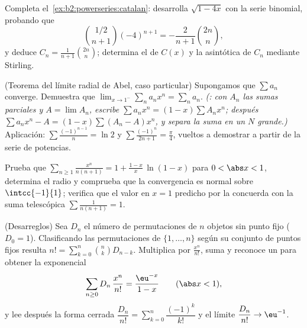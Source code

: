 \begin{exercise}[$\star\star\star$]\label{exo:b2:powerseries:8}
Completa el~\cref{ex:b2:powerseries:catalan}: desarrolla $\sqrt{1 -
4x}$ con la serie binomial, probando que
\[
\binom{1/2}{n+1}(-4)^{n+1} = -\frac{2}{n+1}\binom{2n}{n},
\]
y deduce $C_n = \frac{1}{n+1}\binom{2n}{n}$; determina el
 de $C(x)$ y la asintótica de $C_n$ mediante
Stirling.
\end{exercise}

\begin{exercise}[$\star\star\star$]\label{exo:b2:powerseries:9}
(Teorema del límite radial de Abel, caso particular) Supongamos que
$\sum a_n$ converge. Demuestra que $\lim_{x \to 1^-} \sum_{n} a_n
x^n = \sum_n a_n$. \emph{(: con $A_n$ las sumas
parciales y $A = \lim A_n$, escribe $\sum a_nx^n = (1 - x)\sum A_n
x^n$; después $\sum a_nx^n - A = (1-x)\sum (A_n - A)x^n$, y separa
la suma en un $N$ grande.)} Aplicación: $\sum \frac{(-1)^{n-1}}{n} =
\ln 2$ y $\sum \frac{(-1)^n}{2n+1} = \frac\pi4$, vueltos a demostrar
a partir de la serie de potencias.
\end{exercise}

\begin{exercise}[$\star$]\label{exo:b2:powerseries:10}
Prueba que $\displaystyle\sum_{n\geq1}\frac{x^n}{n(n+1)} = 1 +
\frac{1-x}{x}\,\ln(1-x)$ para $0 < \abs x < 1$, determina el radio y
comprueba que la convergencia es normal sobre $\intcc{-1}{1}$;
verifica que el valor en $x = 1$ predicho por la 
concuerda con la suma telescópica $\sum \frac{1}{n(n+1)} = 1$.
\end{exercise}

\begin{exercise}[$\star\star$]\label{exo:b2:powerseries:11}
(Desarreglos) Sea $D_n$ el número de permutaciones de $n$ objetos
sin punto fijo ($D_0 = 1$). Clasificando las permutaciones de $\{1,
\dots, n\}$ según su conjunto de puntos fijos resulta $n! =
\sum_{k=0}^{n}\binom nk D_{n-k}$. Multiplica por
$\frac{x^n}{n!}$, suma y reconoce un  para obtener
la  exponencial
\[
\sum_{n\geq0} D_n\,\frac{x^n}{n!} = \frac{\eu^{-x}}{1-x}
\qquad (\abs x < 1),
\]
y lee después la forma cerrada $\dfrac{D_n}{n!} =
\sum_{k=0}^{n}\dfrac{(-1)^k}{k!}$ y el límite $\dfrac{D_n}{n!} \to
\eu^{-1}$.
\end{exercise}

